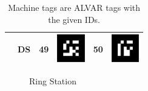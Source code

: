 \documentclass[12pt,twoside]{article}
\begin{document}
\begin{table}[bp]
\begin{tabular}{|l|c|c|c|c|l|}
    &DS&49&\parbox[c]{1.5cm}{\includegraphics[width=1.2cm]{markers/figure_49}}&50&\parbox[c]{1.5cm}{\includegraphics[width=1.2cm]{markers/figure_50}}\\[2.5ex]\hline
  \end{tabular}
  \caption{Machine tags are ALVAR tags with the given IDs.}
  \label{tab:machine-tags}  
\end{table}
\begin{figure}[h]
\centering
{} 
\quad
{}
\vspace{-1ex}
\caption{Ring Station}
\label{fig:RS}
\end{figure}
\end{document}
